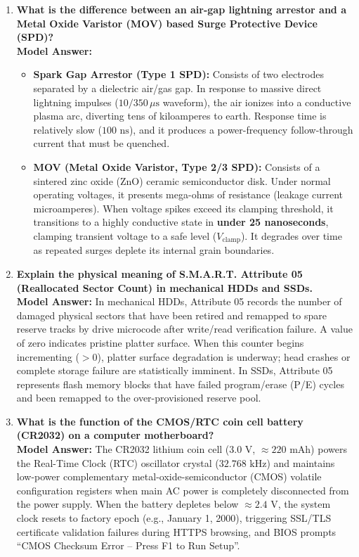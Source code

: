 \begin{enumerate}[leftmargin=*,label=\textbf{Q\arabic*.}]
    \item \textbf{What is the difference between an air-gap lightning arrestor and a Metal Oxide Varistor (MOV) based Surge Protective Device (SPD)?} \\
    \textbf{Model Answer:}
    \begin{itemize}
        \item \textbf{Spark Gap Arrestor (Type 1 SPD):} Consists of two electrodes separated by a dielectric air/gas gap. In response to massive direct lightning impulses ($10/350\,\mu\text{s}$ waveform), the air ionizes into a conductive plasma arc, diverting tens of kiloamperes to earth. Response time is relatively slow ($100\text{ ns}$), and it produces a power-frequency follow-through current that must be quenched.
        \item \textbf{MOV (Metal Oxide Varistor, Type 2/3 SPD):} Consists of a sintered zinc oxide (ZnO) ceramic semiconductor disk. Under normal operating voltages, it presents mega-ohms of resistance (leakage current microamperes). When voltage spikes exceed its clamping threshold, it transitions to a highly conductive state in \textbf{under 25 nanoseconds}, clamping transient voltage to a safe level ($V_{\text{clamp}}$). It degrades over time as repeated surges deplete its internal grain boundaries.
    \end{itemize}

    \item \textbf{Explain the physical meaning of S.M.A.R.T. Attribute 05 (Reallocated Sector Count) in mechanical HDDs and SSDs.} \\
    \textbf{Model Answer:} In mechanical HDDs, Attribute 05 records the number of damaged physical sectors that have been retired and remapped to spare reserve tracks by drive microcode after write/read verification failure. A value of zero indicates pristine platter surface. When this counter begins incrementing ($>0$), platter surface degradation is underway; head crashes or complete storage failure are statistically imminent. In SSDs, Attribute 05 represents flash memory blocks that have failed program/erase (P/E) cycles and been remapped to the over-provisioned reserve pool.

    \item \textbf{What is the function of the CMOS/RTC coin cell battery (CR2032) on a computer motherboard?} \\
    \textbf{Model Answer:} The CR2032 lithium coin cell ($3.0\text{ V}$, $\approx 220\text{ mAh}$) powers the Real-Time Clock (RTC) oscillator crystal ($32.768\text{ kHz}$) and maintains low-power complementary metal-oxide-semiconductor (CMOS) volatile configuration registers when main AC power is completely disconnected from the power supply. When the battery depletes below $\approx 2.4\text{ V}$, the system clock resets to factory epoch (e.g., January 1, 2000), triggering SSL/TLS certificate validation failures during HTTPS browsing, and BIOS prompts ``CMOS Checksum Error -- Press F1 to Run Setup''.


\end{enumerate}
